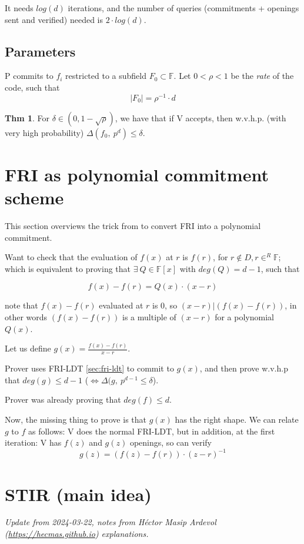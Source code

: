 \documentclass{article}
\theoremstyle{definition}
\newtheorem{theorem}[definition]{Thm}
\begin{document}
\vspace{10px}
It needs $log(d)$ iterations, and the number of queries (commitments + openings sent and verified) needed is $2 \cdot log(d)$.

\subsection{Parameters}

P commits to $f_i$ restricted to a subfield $F_0 \subset \mathbb{F}$.
Let $0<\rho<1$ be the \emph{rate} of the code, such that
$$|F_0| = \rho^{-1} \cdot d$$

\begin{theorem}
	For $\delta \in (0, 1-\sqrt{\rho})$, we have that if V accepts, then w.v.h.p. (with very high probability) $\Delta(f_0,~ p^d) \leq \delta$.
\end{theorem}

\section{FRI as polynomial commitment scheme}
This section overviews the trick from \cite{cryptoeprint:2019/1020} to convert FRI into a polynomial commitment.

Want to check that the evaluation of $f(x)$ at $r$ is $f(r)$, for $r \notin D, r
\in^R \mathbb{F}$; which is equivalent to proving that $\exists ~Q \in \mathbb{F}[x]$ with $deg(Q)=d-1$, such that

$$
f(x)-f(r) = Q(x) \cdot (x-r)
$$

note that $f(x)-f(r)$ evaluated at $r$ is $0$, so $(x-r) | (f(x)-f(r))$, in other words
$(f(x)-f(r))$ is a multiple of $(x-r)$ for a polynomial $Q(x)$.

Let us define $g(x) = \frac{f(x)-f(r)}{x-r}$.

Prover uses FRI-LDT \ref{sec:fri-ldt} to commit to $g(x)$, and then prove w.v.h.p that $deg(g) \leq d-1$ ($\Longleftrightarrow \Delta(g,~ p^{d-1} \leq \delta$).

Prover was already proving that $deg(f) \leq d$.

Now, the missing thing to prove is that $g(x)$ has the right shape. We can relate $g$ to $f$ as follows:
V does the normal FRI-LDT, but in addition, at the first iteration:
V has $f(z)$ and $g(z)$ openings, so can verify
$$g(z) = (f(z)-f(r))\cdot (z-r)^{-1}$$


\section{STIR (main idea)}
\emph{Update from 2024-03-22, notes from Héctor Masip Ardevol (\href{https://hecmas.github.io/}{https://hecmas.github.io}) explanations.}
\end{document}
